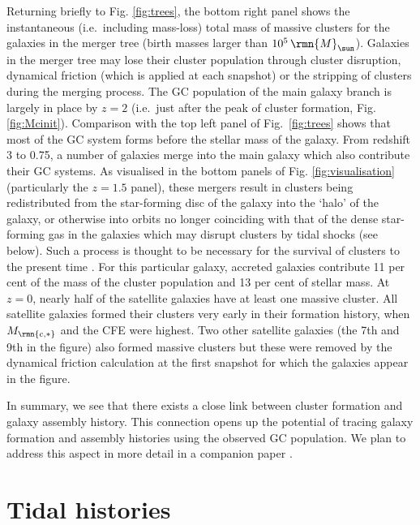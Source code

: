 \documentclass[fleqn,usenatbib]{mnras}
\newcommand\Msun{\,\rmn{M}_{\sun}}
\newcommand{\Mcstar}{M_\rmn{c,\ast}}
\begin{document}
Returning briefly to Fig. \ref{fig:trees}, the bottom right panel shows the instantaneous (i.e.~including mass-loss) total mass of massive clusters for the galaxies in the merger tree (birth masses larger than $10^5 \Msun$). 
Galaxies in the merger tree may lose their cluster population through cluster disruption, dynamical friction (which is applied at each snapshot) or the stripping of clusters during the merging process.
The GC population of the main galaxy branch is largely in place by $z=2$ (i.e.~just after the peak of cluster formation, Fig. \ref{fig:Mcinit}). Comparison with the top left panel of Fig.~\ref{fig:trees} shows that most of the GC system forms before the stellar mass of the galaxy.
From redshift 3 to 0.75, a number of galaxies merge into the main galaxy which also contribute their GC systems. As visualised in the bottom panels of Fig. \ref{fig:visualisation} (particularly the $z=1.5$ panel), these mergers result in clusters being redistributed from the star-forming disc of the galaxy into the `halo' of the galaxy, or otherwise into orbits no longer coinciding with that of the dense star-forming gas in the galaxies which may disrupt clusters by tidal shocks (see below). 
Such a process is thought to be necessary for the survival of clusters to the present time \citep{Kruijssen_15}.
For this particular galaxy, accreted galaxies contribute 11 per cent of the mass of the cluster population and 13 per cent of stellar mass.
At $z=0$, nearly half of the satellite galaxies have at least one massive cluster. All satellite galaxies formed their clusters very early in their formation history, when $\Mcstar$ and the CFE were highest. Two other satellite galaxies (the 7th and 9th in the figure) also formed massive clusters but these were removed by the dynamical friction calculation at the first snapshot for which the galaxies appear in the figure. 

In summary, we see that there exists a close link between cluster formation and galaxy assembly history. This connection opens up the potential of tracing galaxy formation and assembly histories using the observed GC population. We plan to address this aspect in more detail in a companion paper \citep{Kruijssen_et_al_18}.



\section{Tidal histories} \label{sec:tidal_histories}
\end{document}

